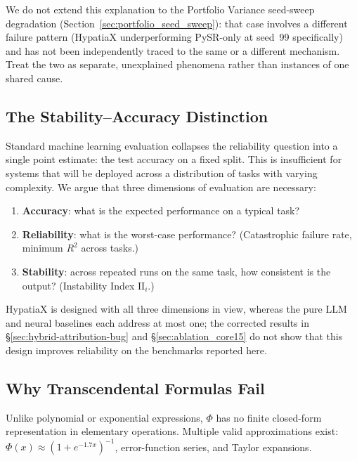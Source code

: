 \documentclass[twoside,11pt]{article}
\newcommand{\Rsq}{R^{2}}
\newcommand{\II}{\mathrm{II}}
\begin{document}
We do not extend this explanation to the Portfolio Variance seed-sweep
degradation (Section~\ref{sec:portfolio_seed_sweep}): that case involves a
different failure pattern (HypatiaX underperforming PySR-only at seed~99
specifically) and has not been independently traced to the same or a
different mechanism. Treat the two as separate, unexplained phenomena
rather than instances of one shared cause.

\subsection{The Stability--Accuracy Distinction}\label{subsec:the-stabilityaccuracy-distinction}
\label{sec:disc_stability}

Standard machine learning evaluation collapses the reliability question into a
single point estimate: the test accuracy on a fixed split.  This is insufficient
for systems that will be deployed across a distribution of tasks with varying
complexity.  We argue that three dimensions of evaluation are necessary:
\begin{enumerate}[leftmargin=2em,label=(\roman*)]
  \item \textbf{Accuracy}: what is the expected performance on a typical task?
  \item \textbf{Reliability}: what is the worst-case performance?
    (Catastrophic failure rate, minimum $\Rsq$ across tasks.)
  \item \textbf{Stability}: across repeated runs on the same task, how consistent
    is the output?  (Instability Index $\II_i$.)
\end{enumerate}

HypatiaX is designed with all three dimensions in view, whereas the pure LLM and neural baselines
each address at most one; the corrected results in \S\ref{sec:hybrid-attribution-bug} and
\S\ref{sec:ablation_core15} do not show that this design improves reliability on the benchmarks reported here.

\subsection{Why Transcendental Formulas Fail}\label{subsec:why-transcendental-formulas-fail}
\label{sec:disc_transcendental}

Unlike polynomial or exponential expressions, $\Phi$ has no finite closed-form
representation in elementary operations.  Multiple valid approximations exist:
$\Phi(x) \approx (1 + e^{-1.7x})^{-1}$, error-function series, and Taylor
expansions.
\end{document}
